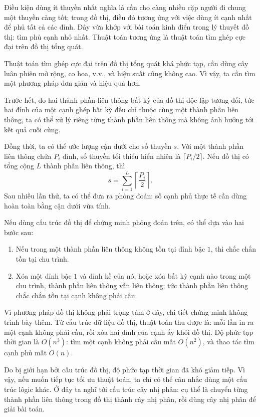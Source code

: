 \documentclass[11pt]{article}
\begin{document}
Điều kiện dùng ít thuyền nhất nghĩa là cần cho càng nhiều cặp người đi chung
một thuyền càng tốt; trong đồ thị, điều đó tương ứng với việc dùng ít cạnh
nhất để phủ tất cả các đỉnh. Đây vừa khớp với bài toán kinh điển trong lý
thuyết đồ thị: tìm phủ cạnh nhỏ nhất. Thuật toán tương ứng là thuật toán tìm
ghép cực đại trên đồ thị tổng quát.

Thuật toán tìm ghép cực đại trên đồ thị tổng quát khá phức tạp, cần dùng cây
luân phiên mở rộng, co hoa, v.v., và hiệu suất cũng không cao. Vì vậy, ta cần
tìm một phương pháp đơn giản và hiệu quả hơn.

Trước hết, do hai thành phần liên thông bất kỳ của đồ thị độc lập tương đối,
tức hai đỉnh của một cạnh ghép bất kỳ đều chỉ thuộc cùng một thành phần liên
thông, ta có thể xử lý riêng từng thành phần liên thông mà không ảnh hưởng
tới kết quả cuối cùng.

Đồng thời, ta có thể ước lượng cận dưới cho số thuyền \(s\). Với một thành
phần liên thông chứa \(P_i\) đỉnh, số thuyền tối thiểu hiển nhiên là
\(\lceil P_i/2\rceil\). Nếu đồ thị có tổng cộng \(L\) thành phần liên thông,
thì
\[
  s=\sum_{i=1}^{L}\left\lceil\frac{P_i}{2}\right\rceil .
\]
Sau nhiều lần thử, ta có thể đưa ra phỏng đoán: số cạnh phủ thực tế cần dùng
hoàn toàn bằng cận dưới vừa tính.

Nếu dùng cấu trúc đồ thị để chứng minh phỏng đoán trên, có thể dựa vào hai
bước sau:
\begin{enumerate}
  \item Nếu trong một thành phần liên thông không tồn tại đỉnh bậc \(1\), thì
  chắc chắn tồn tại chu trình.
  \item Xóa một đỉnh bậc \(1\) và đỉnh kề của nó, hoặc xóa bất kỳ cạnh nào
  trong một chu trình, thành phần liên thông vẫn liên thông; tức thành phần
  liên thông chắc chắn tồn tại cạnh không phải cầu.
\end{enumerate}
Vì phương pháp đồ thị không phải trọng tâm ở đây, chi tiết chứng minh không
trình bày thêm. Từ cấu trúc dữ liệu đồ thị, thuật toán thu được là: mỗi lần
in ra một cạnh không phải cầu, rồi xóa hai đỉnh của cạnh ấy khỏi đồ thị. Độ
phức tạp thời gian là \(O(n^3)\): tìm một cạnh không phải cầu mất \(O(n^2)\),
và thao tác tìm cạnh phủ mất \(O(n)\).

Do bị giới hạn bởi cấu trúc đồ thị, độ phức tạp thời gian đã khó giảm tiếp.
Vì vậy, nếu muốn tiếp tục tối ưu thuật toán, ta chỉ có thể cân nhắc dùng một
cấu trúc lôgic khác. Ở đây ta nghĩ tới cấu trúc cây nhị phân: cụ thể là
chuyển từng thành phần liên thông trong đồ thị thành cây nhị phân, rồi dùng
cây nhị phân để giải bài toán.
\end{document}
